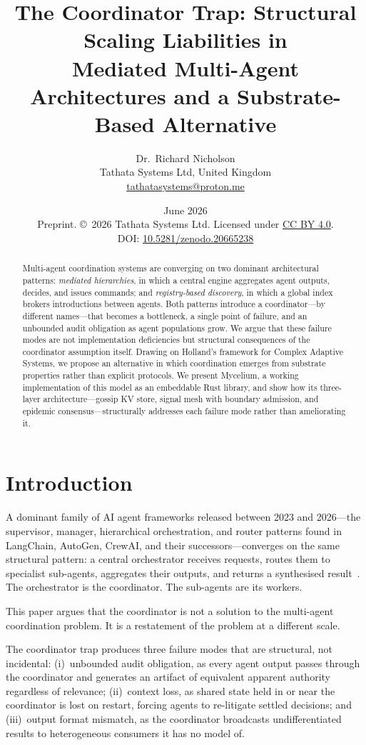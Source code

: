 \documentclass[11pt]{article}
\title{\textbf{The Coordinator Trap: Structural Scaling Liabilities in\\
Mediated Multi-Agent Architectures and a Substrate-Based Alternative}}
\author{%
  Dr.\ Richard Nicholson\\[4pt]
  \small Tathata Systems Ltd, United Kingdom\\
  \small \href{mailto:tathatasystems@proton.me}{tathatasystems@proton.me}
}
\date{June 2026\\[4pt]
\small Preprint. \copyright\ 2026 Tathata Systems Ltd. Licensed under
\href{https://creativecommons.org/licenses/by/4.0/}{CC BY 4.0}.\\
\small DOI: \href{https://doi.org/10.5281/zenodo.20665238}{10.5281/zenodo.20665238}}
\begin{document}
\maketitle

\begin{abstract}
Multi-agent coordination systems are converging on two dominant architectural
patterns: \emph{mediated hierarchies}, in which a central engine aggregates agent
outputs, decides, and issues commands; and \emph{registry-based discovery}, in
which a global index brokers introductions between agents. Both patterns introduce
a coordinator---by different names---that becomes a bottleneck, a single point of
failure, and an unbounded audit obligation as agent populations grow. We
argue that these failure modes are not implementation deficiencies
but structural consequences of the coordinator assumption itself. Drawing on
Holland's framework for Complex Adaptive Systems, we propose an alternative in
which coordination emerges from substrate properties rather than explicit
protocols. We present Mycelium, a working implementation of this model as an
embeddable Rust library, and show how its three-layer architecture---gossip KV
store, signal mesh with boundary admission, and epidemic consensus---structurally
addresses each failure mode rather than ameliorating it.
\end{abstract}

\section{Introduction}

A dominant family of AI agent frameworks released between 2023 and 2026---the
supervisor, manager, hierarchical orchestration, and router patterns found in
LangChain, AutoGen, CrewAI, and their successors---converges on the same
structural pattern: a central orchestrator receives requests, routes them to
specialist sub-agents, aggregates their outputs, and returns a synthesised
result~\cite{silobench,mas-survey,raps}. The orchestrator is the coordinator.
The sub-agents are its workers.

This paper argues that the coordinator is not a solution to the multi-agent
coordination problem. It is a restatement of the problem at a different scale.

The coordinator trap produces three failure modes that are structural, not
incidental: (i)~unbounded audit obligation, as every agent output passes through
the coordinator and generates an artifact of equivalent apparent authority
regardless of relevance; (ii)~context loss, as shared state held in or near the
coordinator is lost on restart, forcing agents to re-litigate settled decisions;
and (iii)~output format mismatch, as the coordinator broadcasts undifferentiated
results to heterogeneous consumers it has no model of.
\end{document}
